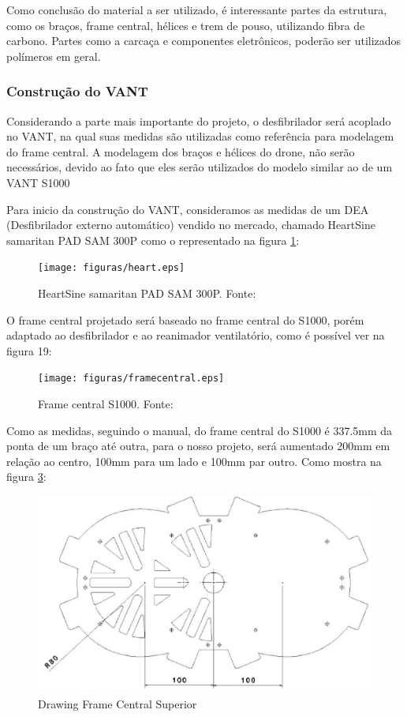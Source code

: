 Como conclusão do material a ser utilizado, é interessante partes da estrutura, como os braços, frame central, hélices e trem de pouso, utilizando fibra de carbono. Partes como a carcaça e componentes eletrônicos, poderão ser utilizados polímeros em geral. 

\subsubsection{Construção do VANT}

Considerando a parte mais importante do projeto, o desfibrilador será acoplado no VANT, na qual suas medidas são utilizadas como referência para modelagem do frame central.  A modelagem dos braços e hélices do drone,  não serão necessários, devido ao fato que eles serão utilizados do modelo similar ao de um VANT S1000

Para inicio da construção do VANT, consideramos as medidas de um DEA (Desfibrilador externo automático) vendido no mercado, chamado HeartSine samaritan PAD SAM 300P  como o representado na figura \ref{fig:heart}:

\begin{figure}[H]
    \centering
      \texttt{[image: figuras/heart.eps]}
    \caption{ HeartSine samaritan PAD SAM 300P. Fonte: \cite{aedsingapore}}
    \label{fig:heart}
\end{figure}

O frame central projetado será baseado no frame central do S1000, porém adaptado ao desfibrilador e ao reanimador ventilatório, como é possível ver na figura 19: 

\begin{figure}[H]
    \centering
      \texttt{[image: figuras/framecentral.eps]}
    \caption{ Frame central S1000. Fonte: \cite{heliguy}}
    \label{fig:framecentral}
\end{figure}


Como as medidas, seguindo o manual, do frame central do S1000 é 337.5mm da ponta de um braço até outra, para o nosso projeto, será aumentado  200mm em relação ao centro, 100mm para um lado e 100mm par outro. Como mostra na figura \ref{fig:drawing}:

\begin{figure}[H]
    \centering
      \includegraphics[keepaspectratio=true,scale=0.5]{figuras/drawing.eps}
    \caption{ Drawing Frame Central Superior}
    \label{fig:drawing}
\end{figure}

